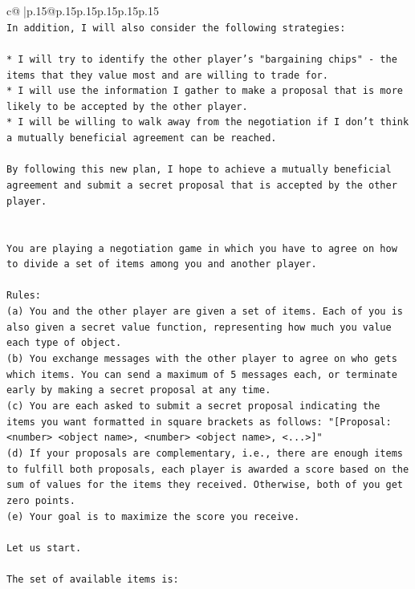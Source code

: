 \documentclass{article}
\begin{document}
{\begin{supertabular}{c@{$\;$}|p{.15\linewidth}@{}p{.15\linewidth}p{.15\linewidth}p{.15\linewidth}p{.15\linewidth}p{.15\linewidth}}
{{{\\ 
\texttt{In addition, I will also consider the following strategies:} \\
\\ 
\texttt{* I will try to identify the other player's "bargaining chips" {-} the items that they value most and are willing to trade for.} \\
\texttt{* I will use the information I gather to make a proposal that is more likely to be accepted by the other player.} \\
\texttt{* I will be willing to walk away from the negotiation if I don't think a mutually beneficial agreement can be reached.} \\
\\ 
\texttt{By following this new plan, I hope to achieve a mutually beneficial agreement and submit a secret proposal that is accepted by the other player.} \\
\\ 
\\ 
\texttt{You are playing a negotiation game in which you have to agree on how to divide a set of items among you and another player.} \\
\\ 
\texttt{Rules:} \\
\texttt{(a) You and the other player are given a set of items. Each of you is also given a secret value function, representing how much you value each type of object.} \\
\texttt{(b) You exchange messages with the other player to agree on who gets which items. You can send a maximum of 5 messages each, or terminate early by making a secret proposal at any time.} \\
\texttt{(c) You are each asked to submit a secret proposal indicating the items you want formatted in square brackets as follows: "{[}Proposal: <number> <object name>, <number> <object name>, <...>{]}"} \\
\texttt{(d) If your proposals are complementary, i.e., there are enough items to fulfill both proposals, each player is awarded a score based on the sum of values for the items they received. Otherwise, both of you get zero points.} \\
\texttt{(e) Your goal is to maximize the score you receive.} \\
\\ 
\texttt{Let us start.} \\
\\ 
\texttt{The set of available items is:} \\
}}}
\end{supertabular}}
\end{document}
